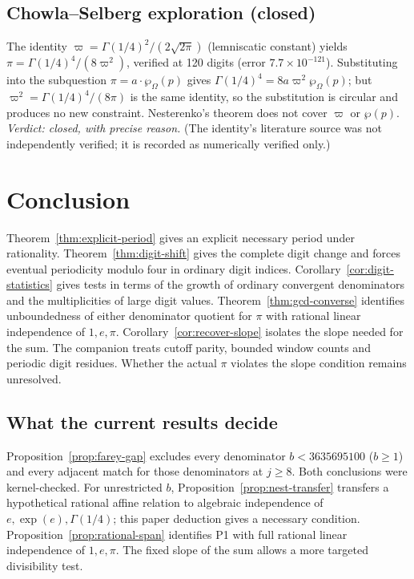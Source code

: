 \documentclass[11pt]{amsart}
\theoremstyle{definition}
\theoremstyle{remark}
\numberwithin{equation}{section}
\begin{document}
\subsection{Chowla--Selberg exploration (closed)}

The identity $\varpi=\Gamma(1/4)^2/(2\sqrt{2\pi})$ (lemniscatic constant) yields $\pi=\Gamma(1/4)^4/(8\varpi^2)$, verified at 120 digits (error $7.7\times10^{-121}$). Substituting into the subquestion $\pi=a\cdot\wp_\Omega(p)$ gives $\Gamma(1/4)^4=8a\varpi^2\wp_\Omega(p)$; but $\varpi^2=\Gamma(1/4)^4/(8\pi)$ is the same identity, so the substitution is circular and produces no new constraint. Nesterenko's theorem does not cover $\varpi$ or $\wp(p)$. \emph{Verdict: closed, with precise reason.} (The identity's literature source was not independently verified; it is recorded as numerically verified only.)

\section{Conclusion}\label{sec:conclusion}
Theorem~\ref{thm:explicit-period} gives an explicit necessary period under rationality. Theorem~\ref{thm:digit-shift} gives the complete digit change and forces eventual periodicity modulo four in ordinary digit indices. Corollary~\ref{cor:digit-statistics} gives tests in terms of the growth of ordinary convergent denominators and the multiplicities of large digit values. Theorem~\ref{thm:gcd-converse} identifies unboundedness of either denominator quotient for $\pi$ with rational linear independence of $1,e,\pi$. Corollary~\ref{cor:recover-slope} isolates the slope needed for the sum. The companion treats cutoff parity, bounded window counts and periodic digit residues. Whether the actual $\pi$ violates the slope condition remains unresolved.

\subsection{What the current results decide}\label{sec:current-results}
Proposition~\ref{prop:farey-gap} excludes every denominator
$b<3635695100$ ($b\ge1$) and every adjacent match for those denominators
at $j\ge8$. Both conclusions were kernel-checked. For unrestricted $b$,
Proposition~\ref{prop:nest-transfer} transfers a hypothetical rational
affine relation to algebraic independence of $e,\exp(e),\Gamma(1/4)$;
this paper deduction gives a necessary condition. Proposition~\ref{prop:rational-span}
identifies P1 with full rational linear independence of $1,e,\pi$.
The fixed slope of the sum allows a more targeted divisibility test.
\end{document}
